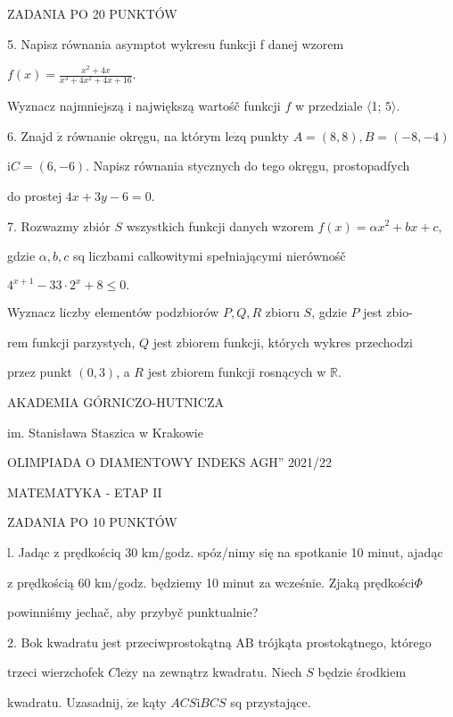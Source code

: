 \documentclass[a4paper,12pt]{article}
\begin{document}
ZADANIA PO 20 PUNKTÓW

5. Napisz równania asymptot wykresu funkcji f danej wzorem

$f(x)=\displaystyle \frac{x^{2}+4x}{x^{3}+4x^{2}+4x+16}.$

Wyznacz najmniejszą i największą wartośč funkcji $f$ w przedziale $\langle$1; $5\rangle.$

6. Znajd $\acute{\mathrm{z}}$ równanie okręgu, na którym $\mathrm{l}\mathrm{e}\dot{\mathrm{z}}\mathrm{q}$ punkty $A=(8,8), B=(-8,-4)$

$\mathrm{i}C= (6,-6)$. Napisz równania stycznych do tego okręgu, prostopadfych

do prostej $4x+3y-6=0.$

7. Rozwazmy zbiór $S$ wszystkich funkcji danych wzorem $f(x)=\alpha x^{2}+bx+c,$

gdzie $\alpha, b, c$ sq liczbami calkowitymi spełniającymi nierównośč

$4^{x+1}-33\cdot 2^{x}+8\leq 0.$

Wyznacz liczby elementów podzbiorów $P, Q, R$ zbioru $S$, gdzie $P$ jest zbio-

rem funkcji parzystych, $Q$ jest zbiorem funkcji, których wykres przechodzi

przez punkt $(0,3)$, a $R$ jest zbiorem funkcji rosnących w $\mathbb{R}.$






AKADEMIA GÓRNICZO-HUTNICZA

im. Stanisława Staszica w Krakowie

OLIMPIADA O DIAMENTOWY INDEKS AGH'' 2021/22

MATEMATYKA - ETAP II

ZADANIA PO 10 PUNKTÓW

l. Jadąc z prędkościq 30 $\mathrm{k}\mathrm{m}/$godz. spóz/nimy się na spotkanie 10 minut, ajadąc

z prędkością 60 $\mathrm{k}\mathrm{m}/$godz. będziemy 10 minut za wcześnie. Zjaką prędkości$\Phi$

powinniśmy jechač, aby przybyč punktualnie?

2. Bok kwadratu jest przeciwprostokątną AB trójkąta prostokątnego, którego

trzeci wierzchofek $C\mathrm{l}\mathrm{e}\dot{\mathrm{z}}\mathrm{y}$ na zewnątrz kwadratu. Niech $S$ będzie środkiem

kwadratu. Uzasadnij, $\dot{\mathrm{z}}\mathrm{e}$ kąty $ACS\mathrm{i}BCS$ sq przystające.
\end{document}
